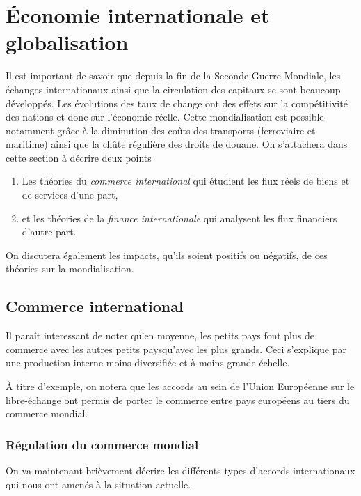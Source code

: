 \section{Économie internationale et globalisation} %
\label{sec:economie_internationale_et_globalisation}

Il est important de savoir que depuis la fin de la Seconde Guerre Mondiale,
les échanges internationaux ainsi que la circulation des capitaux se
sont beaucoup développés.
Les évolutions des taux de change ont des effets sur la compétitivité
des nations et donc sur l'économie réelle.
Cette mondialisation est possible notamment grâce à la diminution
des coûts des transports (ferroviaire et maritime)
ainsi que la chûte régulière des droits de douane.
On s'attachera dans cette section à décrire deux points
\begin{enumerate}
  \item Les théories du \emph{commerce international} qui étudient les flux réels de biens 
  et de services d'une part,
  \item et les théories de la \emph{finance internationale} qui analysent les flux 
  financiers d'autre part.
\end{enumerate}
On discutera également les impacts, qu'ils soient positifs ou négatifs,
de ces théories sur la mondialisation.

\subsection{Commerce international} %
\label{sub:commerce_international}
Il paraît interessant de noter qu'en moyenne, les petits pays font plus 
de commerce avec les autres petits paysqu'avec les plus grands.
Ceci s'explique par une production interne moins diversifiée
et à moins grande échelle.

À titre d'exemple, on notera que les accords au sein de l'Union Européenne
sur le libre-échange ont permis de porter le commerce entre pays européens au tiers
du commerce mondial.


\subsubsection{Régulation du commerce mondial} %
\label{ssub:regulation_du_commerce_mondial}
On va maintenant brièvement décrire les différents types d'accords internationaux
qui nous ont amenés à la situation actuelle.

